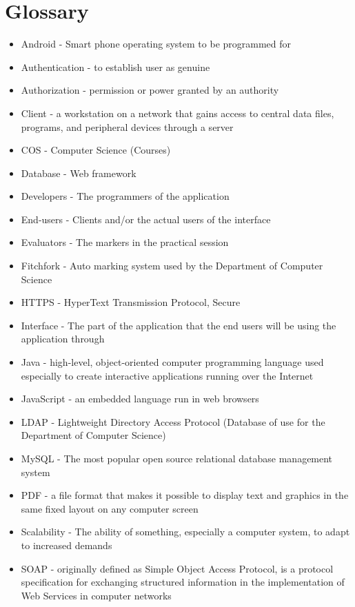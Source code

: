 \section{Glossary}
\begin{itemize}

\item Android - Smart phone operating system to be programmed for
\item Authentication - to establish user as genuine
\item Authorization - permission or power granted by an authority
\item Client - a workstation on a network that gains access to central data files, programs, and peripheral devices through a server
\item COS - Computer Science (Courses)
\item Database - Web framework
\item Developers - The programmers of the application
\item End-users - Clients and/or the actual users of the interface
\item Evaluators - The markers in the practical session
\item Fitchfork - Auto marking system used by the Department of Computer Science
\item HTTPS - HyperText Transmission Protocol, Secure 
\item Interface - The part of the application that the end users will be using the application through
\item Java -  high-level, object-oriented computer programming language used especially to create interactive applications running over the Internet
\item JavaScript - an embedded language run in web browsers
\item LDAP - Lightweight Directory Access Protocol (Database of use for the Department of Computer Science)
\item MySQL - The most popular open source relational database management system
\item PDF - a file format that makes it possible to display text and graphics in the same fixed layout on any computer screen
\item Scalability - The ability of something, especially a computer system, to adapt to increased demands
\item SOAP - originally defined as Simple Object Access Protocol, is a protocol specification for exchanging structured information in the implementation of Web Services in computer networks


\end{itemize}
